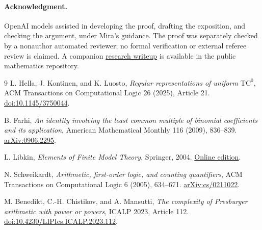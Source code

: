 \documentclass[11pt]{article}
\newcommand{\TC}{\mathrm{TC}^{0}}
\begin{document}
\paragraph{Acknowledgment.}
OpenAI models assisted in developing the proof, drafting the
exposition, and checking the argument, under Mira's guidance.
The proof was separately checked by a nonauthor automated reviewer;
no formal verification or external referee review is claimed.
A companion \href{https://github.com/Mira-Cult/math/tree/main/notes/logic/power-of-two-counting}{research writeup}
is available in the public mathematics repository.

\begin{thebibliography}{9}
L. Hella, J. Kontinen, and K. Luosto,
\emph{Regular representations of uniform \(\TC\)},
ACM Transactions on Computational Logic 26 (2025), Article 21.
\href{https://doi.org/10.1145/3750044}{doi:10.1145/3750044}.

B. Farhi,
\emph{An identity involving the least common multiple of binomial
coefficients and its application},
American Mathematical Monthly 116 (2009), 836--839.
\href{https://arxiv.org/abs/0906.2295}{arXiv:0906.2295}.

L. Libkin, \emph{Elements of Finite Model Theory}, Springer, 2004.
\href{https://www.cs.toronto.edu/~libkin/fmt/fmt.pdf}{Online edition}.

N. Schweikardt,
\emph{Arithmetic, first-order logic, and counting quantifiers},
ACM Transactions on Computational Logic 6 (2005), 634--671.
\href{https://arxiv.org/abs/cs/0211022}{arXiv:cs/0211022}.

M. Benedikt, C.-H. Chistikov, and A. Mansutti,
\emph{The complexity of Presburger arithmetic with power or powers},
ICALP 2023, Article 112.
\href{https://doi.org/10.4230/LIPIcs.ICALP.2023.112}{doi:10.4230/LIPIcs.ICALP.2023.112}.
\end{thebibliography}
\end{document}
